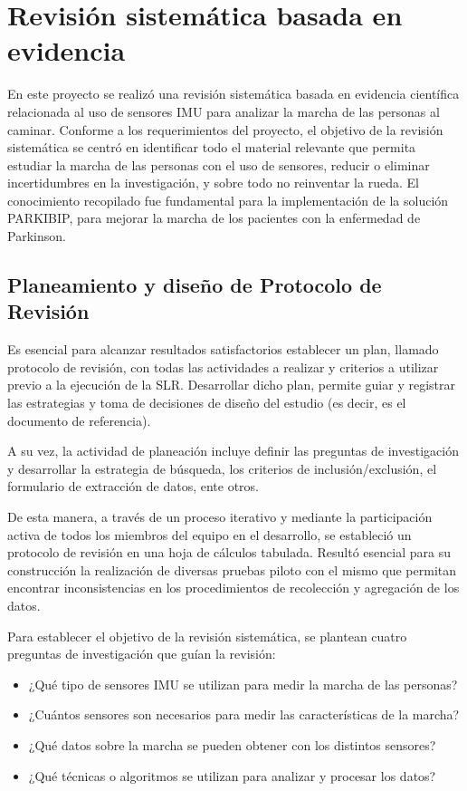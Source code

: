 \chapter{Revisión sistemática basada en evidencia}\label{chap_RSBE}

En este proyecto se realizó una revisión sistemática basada en evidencia científica relacionada al uso de sensores IMU para analizar la marcha de las personas al caminar. Conforme a los requerimientos del proyecto, el objetivo de la revisión sistemática se centró en identificar todo el material relevante que permita estudiar la marcha de las personas con el uso de sensores, reducir o eliminar incertidumbres en la investigación, y sobre todo no reinventar la rueda. El conocimiento recopilado fue fundamental para la implementación de la solución PARKIBIP, para mejorar la marcha de los pacientes con la enfermedad de Parkinson.

\section{Planeamiento y diseño de Protocolo de Revisión}

Es esencial para alcanzar resultados satisfactorios establecer un plan, llamado protocolo de revisión, con todas las actividades a realizar y criterios a utilizar previo a la ejecución de la SLR. Desarrollar dicho plan, permite guiar y registrar las estrategias y toma de decisiones de diseño del estudio (es decir, es el documento de referencia).

A su vez, la actividad de planeación incluye definir las preguntas de investigación y desarrollar la estrategia de búsqueda, los criterios de inclusión/exclusión, el formulario de extracción de datos, ente otros.

De esta manera, a través de un proceso iterativo y mediante la participación activa de todos los miembros del equipo en el desarrollo, se estableció un protocolo de revisión en una hoja de cálculos tabulada. Resultó esencial para su construcción la realización de diversas pruebas piloto con el mismo que permitan encontrar inconsistencias en los procedimientos de recolección y agregación de los datos. 

Para establecer el objetivo de la revisión sistemática, se plantean cuatro preguntas de investigación que guían la revisión:

\begin{itemize}
    \item ¿Qué tipo de sensores IMU se utilizan para medir la marcha de las personas?
    \item ¿Cuántos sensores son necesarios para medir las características de la marcha?
    \item ¿Qué datos sobre la marcha se pueden obtener con los distintos sensores?
    \item ¿Qué técnicas o algoritmos se utilizan para analizar y procesar los datos?
\end{itemize}

